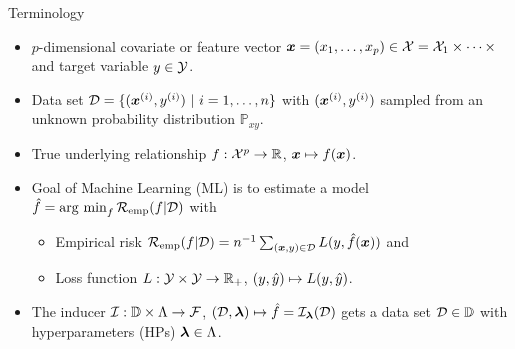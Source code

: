 \documentclass[10pt]{beamer}
\begin{document}
\begin{frame}{Terminology}
  \begin{itemize}

    \item
      $p$-dimensional covariate or feature vector $\bm{x} = (x_1, \dots, x_p) \in \mathcal{X} =  \mathcal{X}_1 \times \cdots\times$ and target variable $y\in\mathcal{Y}$.

    \item
      Data set $\mathcal{D} = \{(\bm{x}^{(i)}, y^{(i)})\ |\ i = 1, \dots, n\}$ with $(\bm{x}^{(i)}, y^{(i)})$ sampled from an unknown probability distribution $\mathbb{P}_{xy}$.

    \item
      True underlying relationship $f : \mathcal{X}^p \to \mathbb{R}$, $\bm{x} \mapsto f(\bm{x})$.

    \item
      Goal of Machine Learning (ML) is to estimate a model $\hat{f} = \operatorname{arg~min}_{f} \mathcal{R}_{\text{emp}}(f | \mathcal{D})$ with
      \begin{itemize}
        \item Empirical risk $\mathcal{R}_{\text{emp}}(f | \mathcal{D}) = n^{-1} \sum_{(\bm{x}, y)\in\mathcal{D}} L(y, \hat{f}(\bm{x}))$ and
        \item Loss function $L : \mathcal{Y}\times\mathcal{Y} \to \mathbb{R}_+$, $(y,\hat{y}) \mapsto L(y,\hat{y})$.
      \end{itemize}

    \item
      The inducer $\mathcal{I} : \mathbb{D} \times \Lambda \to \mathcal{F}$, $(\mathcal{D}, \bm{\lambda}) \mapsto \hat{f}=\mathcal{I}_{\bm{\lambda}}(\mathcal{D})$ gets a data set $\mathcal{D}\in\mathbb{D}$ with hyperparameters (HPs) $\bm{\lambda}\in\Lambda$.

  \end{itemize}
\end{frame}
\end{document}
